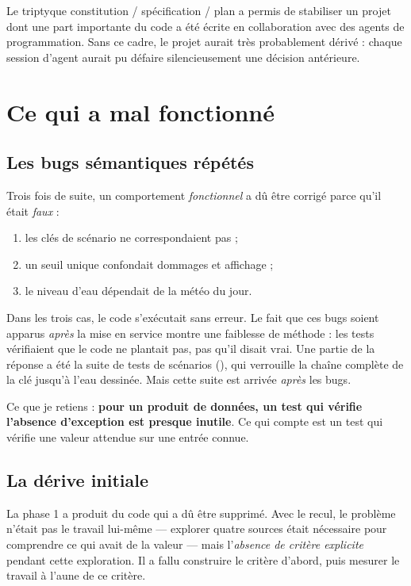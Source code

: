 Le triptyque constitution / spécification / plan a permis de stabiliser un
projet dont une part importante du code a été écrite en collaboration avec des
agents de programmation. Sans ce cadre, le projet aurait très probablement
dérivé : chaque session d'agent aurait pu défaire silencieusement une décision
antérieure.

\section{Ce qui a mal fonctionné}

\subsection{Les bugs sémantiques répétés}

Trois fois de suite, un comportement \emph{fonctionnel} a dû être corrigé parce
qu'il était \emph{faux} :

\begin{enumerate}[leftmargin=1.6em]
  \item les clés de scénario ne correspondaient pas ;
  \item un seuil unique confondait dommages et affichage ;
  \item le niveau d'eau dépendait de la météo du jour.
\end{enumerate}

Dans les trois cas, le code s'exécutait sans erreur. Le fait que ces bugs
soient apparus \emph{après} la mise en service montre une faiblesse de méthode :
les tests vérifiaient que le code ne plantait pas, pas qu'il disait vrai. Une
partie de la réponse a été la suite de tests de scénarios
(), qui verrouille la chaîne complète de la clé
jusqu'à l'eau dessinée. Mais cette suite est arrivée \emph{après} les bugs.

Ce que je retiens : \textbf{pour un produit de données, un test qui vérifie
l'absence d'exception est presque inutile}. Ce qui compte est un test qui
vérifie une valeur attendue sur une entrée connue.

\subsection{La dérive initiale}

La phase 1 a produit du code qui a dû être supprimé. Avec le recul, le
problème n'était pas le travail lui-même — explorer quatre sources était
nécessaire pour comprendre ce qui avait de la valeur — mais l'\emph{absence de
critère explicite} pendant cette exploration. Il a fallu construire le critère
d'abord, puis mesurer le travail à l'aune de ce critère.

